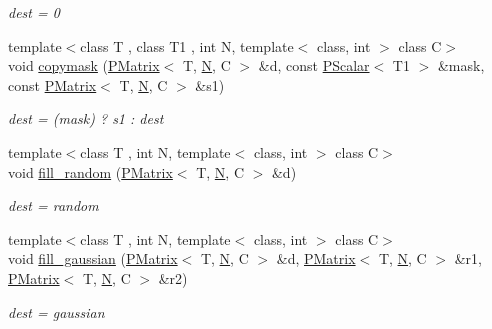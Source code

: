 \begin{DoxyCompactItemize}
\begin{DoxyCompactList}\small\item\em dest = 0 \end{DoxyCompactList}\item 
{\footnotesize template$<$class T , class T1 , int N, template$<$ class, int $>$ class C$>$ }\\void \mbox{\hyperlink{group__primmatrix_ga6bebd0377eb8253b3d4ba1586d1ecdad}{copymask}} (\mbox{\hyperlink{classENSEM_1_1PMatrix}{P\+Matrix}}$<$ T, \mbox{\hyperlink{operator__name__util_8cc_a7722c8ecbb62d99aee7ce68b1752f337}{N}}, C $>$ \&d, const \mbox{\hyperlink{classENSEM_1_1PScalar}{P\+Scalar}}$<$ T1 $>$ \&mask, const \mbox{\hyperlink{classENSEM_1_1PMatrix}{P\+Matrix}}$<$ T, \mbox{\hyperlink{operator__name__util_8cc_a7722c8ecbb62d99aee7ce68b1752f337}{N}}, C $>$ \&s1)
\begin{DoxyCompactList}\small\item\em dest = (mask) ? s1 \+: dest \end{DoxyCompactList}\item 
{\footnotesize template$<$class T , int N, template$<$ class, int $>$ class C$>$ }\\void \mbox{\hyperlink{group__primmatrix_gaa42f6f1f971a8fb7bf5b5b8b0a5a43ec}{fill\+\_\+random}} (\mbox{\hyperlink{classENSEM_1_1PMatrix}{P\+Matrix}}$<$ T, \mbox{\hyperlink{operator__name__util_8cc_a7722c8ecbb62d99aee7ce68b1752f337}{N}}, C $>$ \&d)
\begin{DoxyCompactList}\small\item\em dest = random \end{DoxyCompactList}\item 
{\footnotesize template$<$class T , int N, template$<$ class, int $>$ class C$>$ }\\void \mbox{\hyperlink{group__primmatrix_gaad23aac5e121c759d15b6153996bdf9e}{fill\+\_\+gaussian}} (\mbox{\hyperlink{classENSEM_1_1PMatrix}{P\+Matrix}}$<$ T, \mbox{\hyperlink{operator__name__util_8cc_a7722c8ecbb62d99aee7ce68b1752f337}{N}}, C $>$ \&d, \mbox{\hyperlink{classENSEM_1_1PMatrix}{P\+Matrix}}$<$ T, \mbox{\hyperlink{operator__name__util_8cc_a7722c8ecbb62d99aee7ce68b1752f337}{N}}, C $>$ \&r1, \mbox{\hyperlink{classENSEM_1_1PMatrix}{P\+Matrix}}$<$ T, \mbox{\hyperlink{operator__name__util_8cc_a7722c8ecbb62d99aee7ce68b1752f337}{N}}, C $>$ \&r2)
\begin{DoxyCompactList}\small\item\em dest = gaussian \end{DoxyCompactList}\item 

\end{DoxyCompactItemize}
